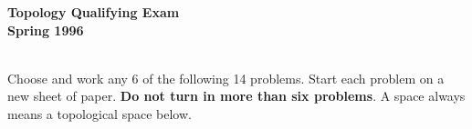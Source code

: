 \documentclass{article}
\begin{document}






\begin{center}\begin{LARGE}
{\bf Topology Qualifying Exam}\\ 
{\bf Spring 1996}\\ \end{LARGE}
\end{center}
\vspace{0.1in}
\noindent\hrulefill\\
Choose and work any 6 of the following 14 problems. Start each problem
on a new sheet of paper. {\bf Do not turn in more than six problems}. A
space always means a topological space below.
\end{document}
